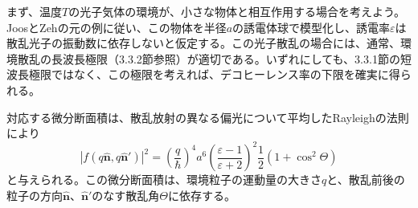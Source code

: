 まず、温度$T$の光子気体の環境が、小さな物体と相互作用する場合を考えよう。JoosとZehの元の例\cite{ref007}に従い、この物体を半径$a$の誘電体球で模型化し、誘電率$\varepsilon$は散乱光子の振動数に依存しないと仮定する。この光子散乱の場合には、通常、環境散乱の長波長極限（3.3.2節参照）が適切である。いずれにしても、3.3.1節の短波長極限ではなく、この極限を考えれば、デコヒーレンス率の下限を確実に得られる。

\hypertarget{srcpage:133}{}\label{srcpage:133}
対応する微分断面積は、散乱放射の異なる偏光について平均したRayleighの法則\cite{ref168}により
\begin{equation}
|f(q\hat{\bm n},q\hat{\bm n}')|^2=\left(\frac q\hbar\right)^4a^6\left(\frac{\varepsilon-1}{\varepsilon+2}\right)^2\frac12(1+\cos^2\Theta)
\tag{3.59}
\end{equation}
と与えられる。この微分断面積は、環境粒子の運動量の大きさ$q$と、散乱前後の粒子の方向$\hat{\bm n}$、$\hat{\bm n}'$のなす散乱角$\Theta$に依存する。

